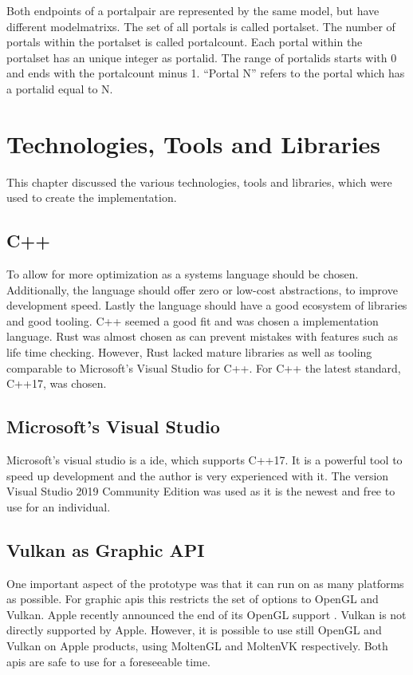 Both \glspl{endpoint} of a \gls{portalpair} are represented by the same model, but have different \glspl{modelmatrix}. The set of all portals is called \gls{portalset}. The number of portals within the \gls{portalset} is called \gls{portalcount}. Each portal within the \gls{portalset} has an unique integer as \gls{portalid}. The range of \glspl{portalid} starts with 0 and ends with the \gls{portalcount} minus 1. \enquote{Portal N} refers to the portal which has a \gls{portalid} equal to N.

\section{Technologies, Tools and Libraries }
This chapter discussed the various technologies, tools and libraries, which were used to create the implementation.

\subsection{C++}
To allow for more optimization as a systems language should be chosen. Additionally, the language should offer zero or low-cost abstractions, to improve development speed. Lastly the language should have a good ecosystem of libraries and good tooling. C++ seemed a good fit and was chosen a implementation language. Rust \cite{rustlang} was almost chosen as can prevent mistakes with features such as life time checking. However, Rust lacked mature libraries as well as tooling comparable to Microsoft's Visual Studio \cite{microsoft:visualstudio} for C++. For C++ the latest standard, C++17, was chosen.

\subsection{Microsoft's Visual Studio}
Microsoft's visual studio is a \gls{ide}, which supports C++17. It is a powerful tool to speed up development and the author is very experienced with it. The version Visual Studio 2019 Community Edition was used as it is the newest and free to use for an individual.

\subsection{Vulkan as Graphic API}
One important aspect of the prototype was that it can run on as many platforms as possible. %
For graphic \glspl{api} this restricts the set of options to OpenGL and Vulkan. Apple recently announced the end of its OpenGL support \cite{arstechnica:openGL}. Vulkan is not directly supported by Apple. However, it is possible to use still OpenGL and Vulkan on Apple products, using MoltenGL \cite{moltenGL} and MoltenVK \cite{moltenVK} respectively. Both \glspl{api} are safe to use for a foreseeable time.

